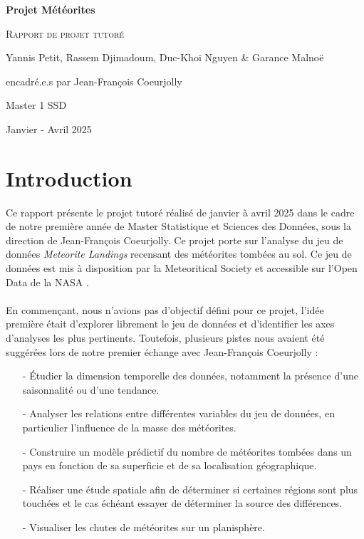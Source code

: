 \documentclass[12pt]{article}
\begin{document}
\begin{titlepage}
    \centering   
    {\huge\bfseries Projet Météorites\par}
    \vspace{1cm}
    {\scshape\Large Rapport de projet tutoré\par}
    \vspace{1.5cm}
    {\large Yannis Petit, Rassem Djimadoum, Duc-Khoi Nguyen \& Garance Malnoë\par
    encadré.e.s par Jean-François Coeurjolly\par}
    \vspace{0.5cm}
    {\large Master 1 SSD\par}
    \vspace{0.5cm}
    {\large Janvier - Avril 2025\par}
    \vspace{3cm}
\end{titlepage}
\tableofcontents
\clearpage
{}
\section{Introduction}
Ce rapport présente le projet tutoré réalisé de janvier à avril 2025 dans le cadre de notre première année de Master Statistique et Sciences des Données, sous la direction de Jean-François Coeurjolly. Ce projet porte sur l'analyse du jeu de données \textit{Meteorite Landings} recensant des météorites tombées au sol. Ce jeu de données est mis à disposition par la Meteoritical Society et accessible sur l'Open Data de la NASA \cite{OpenData_NASA}.\\
\\
En commençant, nous n'avions pas d'objectif défini pour ce projet, l'idée première était d'explorer librement le jeu de données et d'identifier les axes d'analyses les plus pertinents. Toutefois, plusieurs pistes nous avaient été suggérées lors de notre premier échange avec Jean-François Coeurjolly :\\
\begin{itemize}
	\item[-] Étudier la dimension temporelle des données, notamment la présence d'une saisonnalité ou d'une tendance.\\
	\item[-] Analyser les relations entre différentes variables du jeu de données, en particulier l'influence de la masse des 		météorites.\\
	\item[-] Construire un modèle prédictif du nombre de météorites tombées dans un pays en fonction de sa superficie et de sa localisation géographique.\\
	\item[-] Réaliser une étude spatiale afin de déterminer si certaines régions sont plus touchées et le cas échéant essayer de déterminer la source des différences.\\
	\item[-] Visualiser les chutes de météorites sur un planisphère.\\
\end{itemize}
\end{document}
